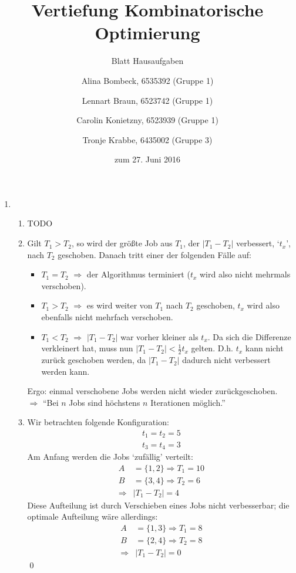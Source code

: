 \documentclass[a4paper]{scrartcl}
\title{Vertiefung Kombinatorische Optimierung}
\subtitle{Blatt {\blattnr} Hausaufgaben}
\author{%
    Alina Bombeck, 6535392 (Gruppe 1) \and
    Lennart Braun, 6523742 (Gruppe 1) \and
    Carolin Konietzny, 6523939 (Gruppe 1) \and
    Tronje Krabbe, 6435002 (Gruppe 3)
}
\date{zum 27. Juni 2016}
\begin{document}
\maketitle


\begin{enumerate}[label=\bfseries \arabic*.]
\item %
\begin{enumerate}
    \item %
        TODO

    \item %
        Gilt $T_1 > T_2$, so wird der größte Job aus $T_1$, der $|T_1 - T_2|$ verbessert, `$t_x$', nach $T_2$ geschoben.
        Danach tritt einer der folgenden Fälle auf:
        \begin{itemize}
            \item $T_1 = T_2$ $\Rightarrow$ der Algorithmus terminiert ($t_x$ wird also nicht mehrmals verschoben).
            \item $T_1 > T_2$ $\Rightarrow$ es wird weiter von $T_1$ nach $T_2$ geschoben, $t_x$ wird also ebenfalls
                nicht mehrfach verschoben.
            \item $T_1 < T_2$ $\Rightarrow$ $|T_1 - T_2|$ war vorher kleiner als $t_x$. Da sich die Differenze
                verkleinert hat, muss nun $|T_1 - T_2| < \frac{1}{2} t_x$ gelten.
                D.h. $t_x$ kann nicht zurück geschoben werden, da $|T_1 - T_2|$ dadurch nicht verbessert werden kann.
        \end{itemize}
        Ergo: einmal verschobene Jobs werden nicht wieder zurückgeschoben.\\
        $\Rightarrow$ ``Bei $n$ Jobs sind höchstens $n$ Iterationen möglich.''

    \item %
        Wir betrachten folgende Konfiguration:
        \begin{align*}
            t_1 = t_2 = 5\\
            t_3 = t_4 = 3
        \end{align*}
        Am Anfang werden die Jobs `zufällig' verteilt:
        \begin{align*}
            A& = \{1,2\} \Rightarrow T_1 = 10\\
            B& = \{3,4\} \Rightarrow T_2 =  6\\
            \Rightarrow& |T_1 - T_2| = 4
        \end{align*}
        Diese Aufteilung ist durch Verschieben eines Jobs nicht verbesserbar;
        die optimale Aufteilung wäre allerdings:
        \begin{align*}
            A& = \{1,3\} \Rightarrow T_1 = 8\\
            B& = \{2,4\} \Rightarrow T_2 = 8\\
            \Rightarrow& |T_1 - T_2| = 0
        \end{align*}
        \qed
\end{enumerate}


\end{enumerate}
\end{document}
